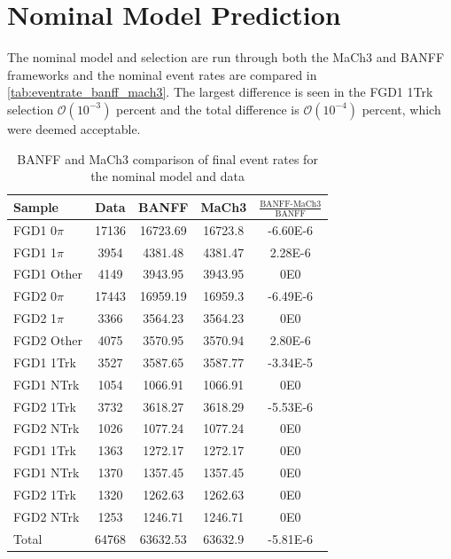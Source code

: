 \section{Nominal Model Prediction}
The nominal model and selection are run through both the MaCh3 and BANFF frameworks and the nominal event rates are compared in \autoref{tab:eventrate_banff_mach3}. The largest difference is seen in the FGD1 1Trk selection $\mathcal{O}(10^{-3})$ percent and the total difference is $\mathcal{O}(10^{-4})$ percent, which were deemed acceptable.
\begin{table}[h]
	\centering
	\begin{tabular}{ l | c c c c }
		\hline 
		\hline 
		Sample & Data  & BANFF & MaCh3 & $\frac{\text{BANFF-MaCh3}}{\text{BANFF}}$ \\ 
		\hline
		FGD1 0$\pi$ &  17136 &  16723.69 & 16723.8 & -6.60E-6 \\
		FGD1 1$\pi$ &  3954 &  4381.48 & 4381.47 & 2.28E-6\\ 
		FGD1 Other &  4149 &  3943.95 & 3943.95 & 0E0\\ 
		\hline
		FGD2 0$\pi$ &  17443 &  16959.19 & 16959.3 & -6.49E-6 \\
		FGD2 1$\pi$ &  3366 &  3564.23 & 3564.23 & 0E0\\
		FGD2 Other &  4075 &  3570.95 & 3570.94 & 2.80E-6 \\
		\hline
		FGD1 1Trk &  3527 &  3587.65 & 3587.77 & -3.34E-5\\ 
		FGD1 NTrk &  1054 &  1066.91 & 1066.91 & 0E0\\
		\hline
		FGD2 1Trk &  3732 &  3618.27 & 3618.29 & -5.53E-6 \\
		FGD2 NTrk &  1026 &  1077.24 & 1077.24 & 0E0 \\
		\hline
		FGD1 \numu 1Trk &  1363 &  1272.17 & 1272.17 & 0E0\\
		FGD1 \numu NTrk &  1370 &  1357.45 & 1357.45 & 0E0 \\
		\hline
		FGD2 \numu 1Trk &  1320 &  1262.63 & 1262.63 & 0E0 \\
		FGD2 \numu NTrk &  1253 &  1246.71 & 1246.71 & 0E0 \\
		\hline
		Total &  64768 &  63632.53 & 63632.9 & -5.81E-6 \\
		\hline
		\hline
	\end{tabular}
	\caption{BANFF and MaCh3 comparison of final event rates for the nominal model and data}
	\label{tab:eventrate_banff_mach3}
\end{table}

